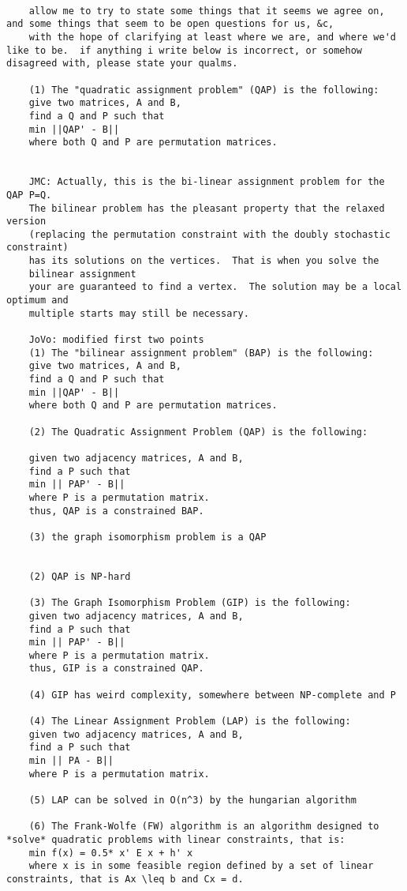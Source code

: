 \begin{verbatim}

	allow me to try to state some things that it seems we agree on, and some things that seem to be open questions for us, &c,
	with the hope of clarifying at least where we are, and where we'd like to be.  if anything i write below is incorrect, or somehow disagreed with, please state your qualms.

	(1) The "quadratic assignment problem" (QAP) is the following:  
	give two matrices, A and B,
	find a Q and P such that
	min ||QAP' - B||
	where both Q and P are permutation matrices.


	JMC: Actually, this is the bi-linear assignment problem for the QAP P=Q.
	The bilinear problem has the pleasant property that the relaxed version
	(replacing the permutation constraint with the doubly stochastic constraint)
	has its solutions on the vertices.  That is when you solve the
	bilinear assignment
	your are guaranteed to find a vertex.  The solution may be a local optimum and
	multiple starts may still be necessary.
	
	JoVo: modified first two points
	(1) The "bilinear assignment problem" (BAP) is the following:  
	give two matrices, A and B,
	find a Q and P such that
	min ||QAP' - B||
	where both Q and P are permutation matrices.

	(2) The Quadratic Assignment Problem (QAP) is the following:

	given two adjacency matrices, A and B,
	find a P such that
	min || PAP' - B||
	where P is a permutation matrix.
	thus, QAP is a constrained BAP.

	(3) the graph isomorphism problem is a QAP
	
	
	(2) QAP is NP-hard

	(3) The Graph Isomorphism Problem (GIP) is the following:
	given two adjacency matrices, A and B,
	find a P such that
	min || PAP' - B||
	where P is a permutation matrix.
	thus, GIP is a constrained QAP.

	(4) GIP has weird complexity, somewhere between NP-complete and P

	(4) The Linear Assignment Problem (LAP) is the following:
	given two adjacency matrices, A and B,
	find a P such that
	min || PA - B||
	where P is a permutation matrix.

	(5) LAP can be solved in O(n^3) by the hungarian algorithm

	(6) The Frank-Wolfe (FW) algorithm is an algorithm designed to *solve* quadratic problems with linear constraints, that is:
	min f(x) = 0.5* x' E x + h' x
	where x is in some feasible region defined by a set of linear constraints, that is Ax \leq b and Cx = d.


\end{verbatim}

